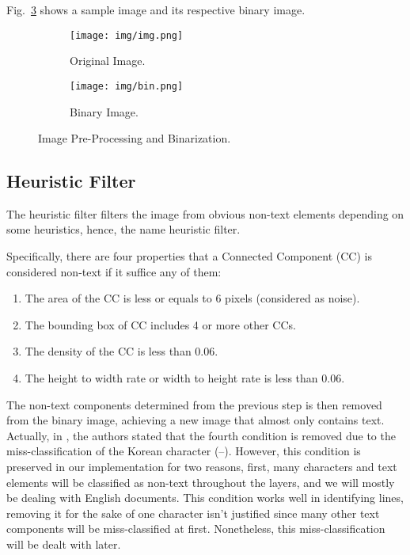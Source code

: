 \documentclass[conference]{IEEEtran}
\begin{document}
    Fig.~\ref{fig:bin} shows a sample image and its respective binary image.

    \begin{figure}[htbp]
        \centering
        \begin{subfigure}[b]{0.49\linewidth}
            \centering
            \texttt{[image: img/img.png]}
            \caption{Original Image.}
            \label{img:org}
        \end{subfigure}
        \hfill
        \begin{subfigure}[b]{0.49\linewidth}
            \centering
            \texttt{[image: img/bin.png]}
            \caption{Binary Image.}
            \label{img:bin}
        \end{subfigure}
        \caption{Image Pre-Processing and Binarization.}
        \label{fig:bin}
    \end{figure}


    \subsection{Heuristic Filter}

    The heuristic filter filters the image from obvious non-text elements depending on some heuristics, hence, the name
    heuristic filter.

    Specifically, there are four properties that a Connected Component (CC) is considered non-text if it suffice any of them:
    \begin{enumerate}
        \item The area of the CC is less or equals to 6 pixels (considered as noise).
        \item The bounding box of CC includes 4 or more other CCs.
        \item The density of the CC is less than 0.06.
        \item The height to width rate or width to height rate is less than 0.06.
    \end{enumerate}
    
    The non-text components determined from the previous step is then removed from the binary image, achieving a new image
    that almost only contains text.
    Actually, in \cite{mhs}, the authors stated that the fourth condition is removed due to the miss-classification of the Korean
    character (--).
    However, this condition is preserved in our implementation for two reasons, first, many characters and text
    elements will be classified as non-text throughout the layers, and we will mostly be dealing with English documents.
    This condition works well in identifying lines, removing it for the sake of one character isn't justified since many other text
    components will be miss-classified at first. Nonetheless, this miss-classification will be dealt with later.
\end{document}
